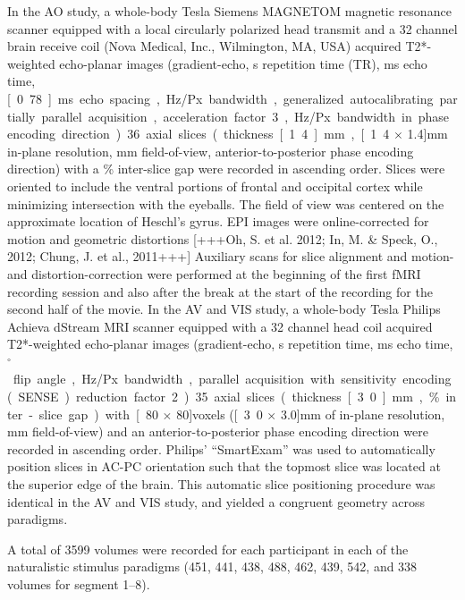 \documentclass[english]{article}
\begin{document}
In the AO study, a whole-body \unit[7]{Tesla} Siemens MAGNETOM magnetic
resonance scanner equipped with a local circularly polarized head transmit and a
32 channel brain receive coil (Nova Medical, Inc., Wilmington, MA, USA) acquired
T2*-weighted echo-planar images (gradient-echo, \unit[2]{s} repetition time
(TR), \unit[22]{ms} echo time, \unit[0.78]{ms} echo spacing, \unit[1488]{Hz/Px}
bandwidth, generalized autocalibrating partially parallel acquisition,
acceleration factor 3, \unit[2]{Hz/Px} bandwidth in phase encoding direction).
36 axial slices (thickness \unit[1.4]{mm}, \unit[1.4 $\times$ 1.4]{mm} in-plane
resolution, \unit[224]{mm} field-of-view, anterior-to-posterior phase encoding
direction) with a \unit[10]{\%} inter-slice gap were recorded in ascending
order.
Slices were oriented to include the ventral portions of frontal and occipital
cortex while minimizing intersection with the eyeballs.
The field of view was centered on the approximate location of Heschl's gyrus.
EPI images were online-corrected for motion and geometric distortions [+++Oh, S.
et al. 2012; In, M. \& Speck, O., 2012; Chung, J. et al., 2011+++]
Auxiliary scans for slice alignment and motion- and distortion-correction were
performed at the beginning of the first fMRI recording session and also after
the break at the start of the recording for the second half of the movie.
In the AV and VIS study, a whole-body \unit[3]{Tesla} Philips Achieva dStream
MRI scanner equipped with a 32 channel head coil acquired T2*-weighted
echo-planar images (gradient-echo, \unit[2]{s} repetition time, \unit[30]{ms}
echo time, \unit[90]{$^{\circ}$} flip angle, \unit[1943]{Hz/Px} bandwidth,
parallel acquisition with sensitivity encoding (SENSE) reduction factor 2).
35 axial slices (thickness \unit[3.0]{mm}, \unit[10]{\%} inter-slice gap) with
\unit[80 $\times$ 80]{voxels} (\unit[3.0 $\times$ 3.0]{mm} of in-plane
resolution, \unit[240]{mm} field-of-view) and an anterior-to-posterior phase
encoding direction were recorded in ascending order.
Philips' ``SmartExam'' was used to automatically position slices in AC-PC
orientation such that the topmost slice was located at the superior edge of the
brain. This automatic slice positioning procedure was identical in the AV and
VIS study, and yielded a congruent geometry across paradigms.

A total of 3599 volumes were recorded for each participant in each of the
naturalistic stimulus paradigms (451, 441, 438, 488, 462, 439, 542, and 338
volumes for segment 1–8).
\end{document}
